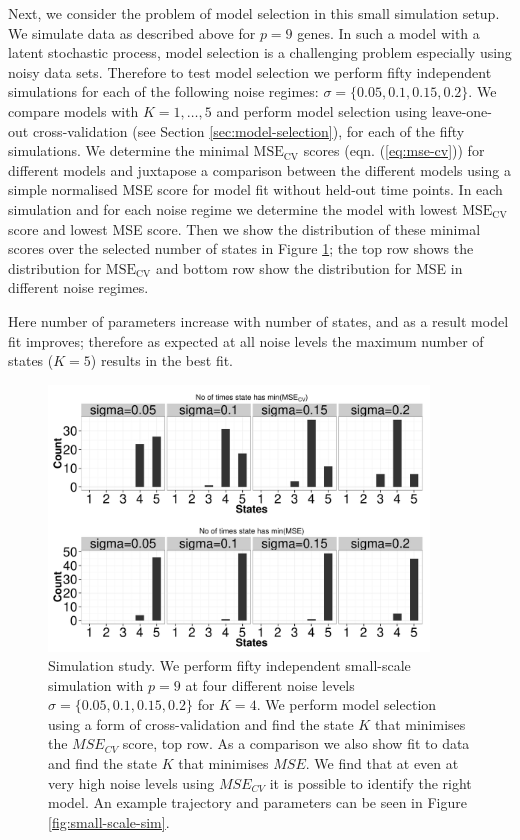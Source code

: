 Next, we consider the problem of model selection in this small simulation setup. We simulate data as described above for $p=9$ genes. In such a model with a latent stochastic process, model selection is a challenging problem especially using noisy data sets. Therefore to test model selection we perform fifty independent simulations for each of the following noise regimes: $\sigma = \lbrace 0.05, 0.1, 0.15, 0.2 \rbrace $. We compare models with $K = 1, \ldots, 5$ and perform model selection using leave-one-out cross-validation (see Section \ref{sec:model-selection}), for each of the fifty simulations. We determine the minimal $\mathrm{MSE_{CV}}$ scores (eqn. (\ref{eq:mse-cv})) for different models and juxtapose a comparison between the different models using a simple normalised MSE score for model fit without held-out time points. In each simulation and for each noise regime we determine the model with lowest $\mathrm{MSE_{CV}}$ score and lowest MSE score. Then we show the distribution of these minimal scores over the selected number of states in Figure \ref{fig:small-scale-modelSlct}; the top row shows the distribution for $\mathrm{MSE_{CV}}$ and bottom row show the distribution for MSE in different noise regimes.

Here number of parameters increase with number of states, and as a result model fit improves; therefore as expected at all noise levels the maximum number of states ($K=5$) results in the best fit.

\begin{figure}
  \centering
  \includegraphics[width=0.9\textwidth]{pics/hist-all.pdf}
  \caption{Simulation study. We perform fifty independent small-scale simulation with $p=9$ at four different noise levels $\sigma = \lbrace 0.05, 0.1, 0.15, 0.2\rbrace$ for $K=4$. We perform model selection using a form of cross-validation and find the state $K$ that minimises the $MSE_{CV}$ score, top row. As a comparison we also show fit to data and find the state $K$ that minimises $MSE$. We find that at even at very high noise levels using $MSE_{CV}$ it is possible to identify the right model. An example trajectory and parameters can be seen in Figure \ref{fig:small-scale-sim}.}
  \label{fig:small-scale-modelSlct}
\end{figure}

